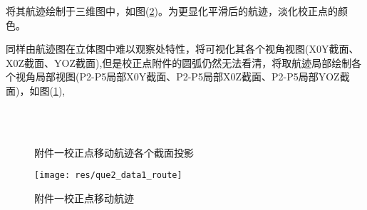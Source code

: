 将其航迹绘制于三维图中，如图(\ref{fig:res-qu2-1})。为更显化平滑后的航迹，淡化校正点的颜色。

同样由航迹图在立体图中难以观察处特性，将可视化其各个视角视图(X0Y截面、X0Z截面、YOZ截面),但是校正点附件的圆弧仍然无法看清，将取航迹局部绘制各个视角局部视图(P2-P5局部X0Y截面、P2-P5局部X0Z截面、P2-P5局部YOZ截面)，如图(\ref{fig:res-qu2-1-add}),\shuomingxx
\begin{figure}[!htbp]
	\centering
	 \quad
	 \\
     \quad
	 \\
     \quad
	\caption{附件一校正点移动航迹各个截面投影}
	\label{fig:res-qu2-1-add}
\end{figure}

\begin{figure}[htbp!]
    \centering
    \texttt{[image: res/que2\_data1\_route]}
    \caption{附件一校正点移动航迹}
    \label{fig:res-qu2-1}
\end{figure}

